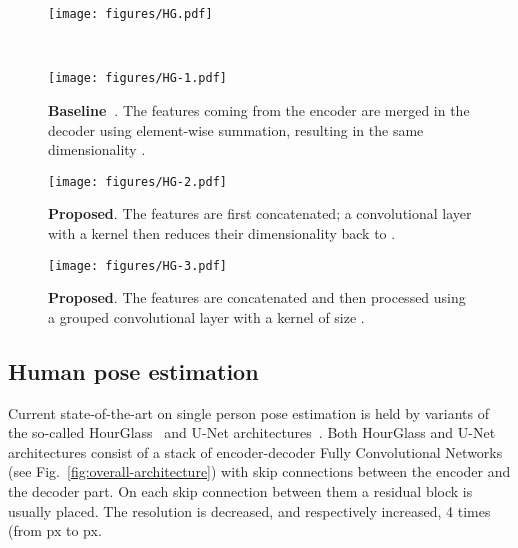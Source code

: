 \documentclass[a4paper, 10pt, conference]{ieeeconf}      \usepackage{FG2020}
\begin{document}
\begin{figure*}[t]
\centering
\begin{subfigure}[t]{\textwidth}
\centering
\texttt{[image: figures/HG.pdf]}
\end{subfigure}\\
\begin{subfigure}[t]{.3\textwidth}
\texttt{[image: figures/HG-1.pdf]}
\caption{\textbf{Baseline~\cite{newell2016stacked}}. The features coming from the encoder are merged in the decoder using element-wise summation, resulting in the same dimensionality .}
\label{sfig:block1}
\end{subfigure}
\hfill
\begin{subfigure}[t]{.3\textwidth}
\texttt{[image: figures/HG-2.pdf]}
\caption{\textbf{Proposed}. The features are first concatenated; a convolutional layer with a  kernel then reduces their dimensionality back to .}
\label{sfig:block2}
\end{subfigure}
\hfill
\begin{subfigure}[t]{.3\textwidth}
\texttt{[image: figures/HG-3.pdf]}
\caption{\textbf{Proposed}. The features are concatenated and then processed using a grouped convolutional layer with a kernel of size . }
\label{sfig:block3}
\end{subfigure}
\caption{\textbf{Overall network architecture.} We depict the overall network architecture (top-row) and detail the various ways in which features coming from the skip connections are agregated i) in existing work~(\ref{sfig:block1}), (ii) our proposed concatenation approach~(\ref{sfig:block2}) and (iii) our proposed concatenation with grouped convolution~(\ref{sfig:block3}). Each yellow rectangular cuboid depicts the hierarchical residual module shown in Fig.~\ref{fig:residul-block-alpha}, the red one a max-pooling layer and the blue one a nearest neighbour upsampling operation. For our method the number of parameters is varied by changing the width (i.e number of channels) and the number of stacks.}
\label{fig:overall-architecture}
\vspace{-0.5cm}
\end{figure*}

\subsection{Human pose estimation}\label{ssec:human-pose-estimation}

Current state-of-the-art on single person pose estimation is held by variants of the so-called HourGlass~\cite{newell2016stacked,wei2016convolutional,bulat2016human,ke2018multi,chu2017multi,yang2017learning,chen2017adversarial} and U-Net architectures~\cite{ronneberger2015u,tang2018deeply,tang2018cu}. Both HourGlass and U-Net architectures consist of a stack of encoder-decoder Fully Convolutional Networks (see Fig.~\ref{fig:overall-architecture}) with skip connections between the encoder and the decoder part. On each skip connection between them a residual block is usually placed. The resolution is decreased, and respectively increased, 4 times (from px to px. 
\end{document}
